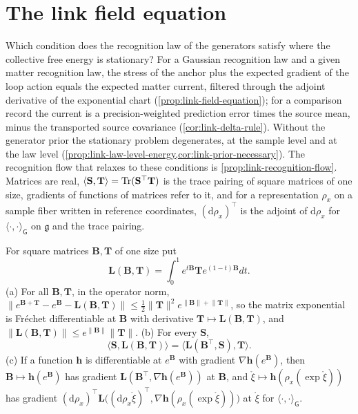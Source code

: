 \section{The link field equation}
\label{sec:link-field}

Which condition does the recognition law of the generators satisfy where the collective free energy is
stationary? For a Gaussian recognition law and a given matter recognition law, the stress of the anchor
plus the expected gradient of the loop action equals the expected matter current, filtered through the
adjoint derivative of the exponential chart (\cref{prop:link-field-equation}); for a comparison record the
current is a precision-weighted prediction error times the source mean, minus the transported source
covariance (\cref{cor:link-delta-rule}). Without the generator prior the stationary problem degenerates,
at the sample level and at the law level (\cref{prop:link-law-level-energy,cor:link-prior-necessary}). The
recognition flow that relaxes to these conditions is \cref{prop:link-recognition-flow}. Matrices are real,
$\langle\mathbf S,\mathbf T\rangle=\operatorname{Tr}(\mathbf S^\top\mathbf T)$ is the trace pairing of square matrices of
one size, gradients of functions of matrices refer to it, and for a representation $\rho_x$ on a sample
fiber written in reference coordinates, $(\mathrm d\rho_x)^\top$ is the adjoint of $\mathrm d\rho_x$ for
$\langle\cdot,\cdot\rangle_{\mathsf G}$ on $\mathfrak g$ and the trace pairing.

For square matrices $\mathbf B,\mathbf T$ of one size put
\begin{equation}
\mathbf L(\mathbf B,\mathbf T)=\int_0^1e^{t\mathbf B}\mathbf Te^{(1-t)\mathbf B}dt.
\label{eq:link-exp-derivative}
\end{equation}
(a) For all $\mathbf B,\mathbf T$, in the operator norm,
$\lVert e^{\mathbf B+\mathbf T}-e^{\mathbf B}-\mathbf L(\mathbf B,\mathbf T)\rVert\leq\frac12\lVert\mathbf T\rVert^2e^{\lVert\mathbf B\rVert+\lVert\mathbf T\rVert}$,
so the matrix exponential is Fr\'echet differentiable at $\mathbf B$ with derivative
$\mathbf T\mapsto\mathbf L(\mathbf B,\mathbf T)$, and
$\lVert\mathbf L(\mathbf B,\mathbf T)\rVert\leq e^{\lVert\mathbf B\rVert}\lVert\mathbf T\rVert$. (b) For every
$\mathbf S$,
\begin{equation}
\langle\mathbf S,\mathbf L(\mathbf B,\mathbf T)\rangle=\langle\mathbf L(\mathbf B^\top,\mathbf S),\mathbf T\rangle.
\label{eq:link-exp-adjoint}
\end{equation}
(c) If a function $\mathbf h$ is differentiable at $e^{\mathbf B}$ with gradient $\nabla\mathbf h(e^{\mathbf B})$,
then $\mathbf B\mapsto\mathbf h(e^{\mathbf B})$ has gradient $\mathbf L(\mathbf B^\top,\nabla\mathbf h(e^{\mathbf B}))$
at $\mathbf B$, and $\mathring\xi\mapsto\mathbf h(\rho_x(\exp\mathring\xi))$ has gradient
$(\mathrm d\rho_x)^\top\mathbf L\bigl((\mathrm d\rho_x\mathring\xi)^\top,\nabla\mathbf h(\rho_x(\exp\mathring\xi))\bigr)$ at
$\mathring\xi$ for $\langle\cdot,\cdot\rangle_{\mathsf G}$. 

